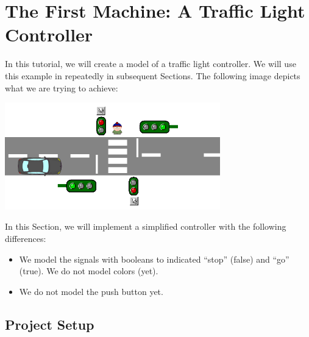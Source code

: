 \section{The First Machine: A Traffic Light Controller}
\label{Tutorial_03}



In this tutorial, we will create a model of a traffic light controller.  We will use this example in repeatedly in subsequent Sections.  The following image depicts what we are trying to achieve:

\begin{center}
	\includegraphics[width=0.7\textwidth]{img/tutorial/trafficlight.png}
\end{center}

In this Section, we will implement a simplified controller with the following differences:
\begin{itemize}
	\item We model the signals with booleans to indicated ``stop'' (false) and ``go'' (true).  We do not model colors (yet).
	\item We do not model the push button yet.
\end{itemize}

\subsection{Project Setup}

